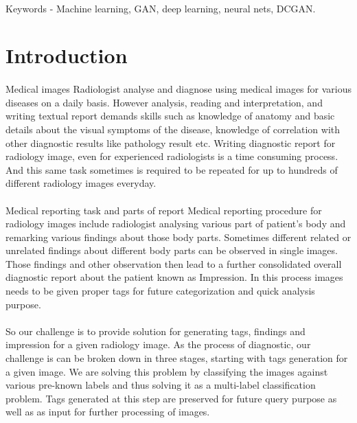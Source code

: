 \documentclass[12pt]{article}
\numberwithin{figure}{section}
\begin{document}
\\
Keywords - Machine learning, GAN, deep learning, neural nets, DCGAN.
\\
\clearpage
\tableofcontents
\clearpage
\listoffigures 
\listoftables
\clearpage
{}
\section{Introduction}
\paragraph{}
Medical images
Radiologist analyse and diagnose using medical images for various diseases on a daily basis. However analysis, reading and interpretation, and writing textual report demands skills such as knowledge of anatomy and basic details about the visual symptoms of the disease, knowledge of correlation with other diagnostic results like pathology result etc.
Writing diagnostic report for radiology image, even for experienced radiologists is a time consuming process. And this same task sometimes is required to be repeated for up to hundreds of different radiology images everyday.
\paragraph{}
Medical reporting task and parts of report
Medical reporting procedure for radiology images include radiologist analysing various part of patient’s body and remarking various findings about those body parts. Sometimes different related or unrelated findings about different body parts can be observed in single images. Those findings and other observation then lead to a further consolidated overall diagnostic report about the patient known as Impression. In this process images needs to be given proper tags for future categorization and quick analysis purpose.
\paragraph{}
So our challenge is to provide solution for generating tags, findings and impression for a given radiology image. As the process of diagnostic, our challenge is can be broken down in three stages, starting with tags generation for a given image. We are solving this problem by classifying the images against various pre-known labels and thus solving it as a multi-label classification problem. Tags generated at this step are preserved for future query purpose as well as as input for further processing of images. 
\end{document}
